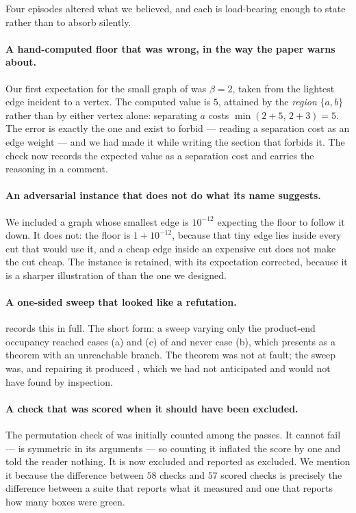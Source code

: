 \documentclass[11pt,twocolumn,a4paper]{article}
\theoremstyle{thmstyle}
\theoremstyle{definition}
\theoremstyle{remark}
\newcommand{\flo}{\beta}
\begin{document}
Four episodes altered what we believed, and each is load-bearing enough to
state rather than to absorb silently.

\paragraph{A hand-computed floor that was wrong, in the way the paper warns
about.} Our first expectation for the small graph of  was
$\flo=2$, taken from the lightest edge incident to a vertex. The computed
value is $5$, attained by the \emph{region} $\{a,b\}$ rather than by either
vertex alone: separating $a$ costs $\min(2+5,\,2+3)=5$. The error is exactly
the one  and  exist to forbid --- reading
a separation cost as an edge weight --- and we had made it while writing the
section that forbids it. The check now records the expected value as a
separation cost and carries the reasoning in a comment.

\paragraph{An adversarial instance that does not do what its name suggests.}
We included a graph whose smallest edge is $10^{-12}$ expecting the floor to
follow it down. It does not: the floor is $1+10^{-12}$, because that tiny edge
lies inside every cut that would use it, and a cheap edge inside an expensive
cut does not make the cut cheap. The instance is retained, with its
expectation corrected, because it is a sharper illustration of
 than the one we designed.

\paragraph{A one-sided sweep that looked like a refutation.}
 records this in full. The short form: a sweep
varying only the product-end occupancy reached cases (a) and (c) of
 and never case (b), which presents as a theorem with an
unreachable branch. The theorem was not at fault; the sweep was, and repairing
it produced , which we had not anticipated and would not
have found by inspection.

\paragraph{A check that was scored when it should have been excluded.} The
permutation check of  was initially counted among the
passes. It cannot fail ---  is symmetric in its arguments ---
so counting it inflated the score by one and told the reader nothing. It is
now excluded and reported as excluded. We mention it because the difference
between $58$ checks and $57$ scored checks is precisely the difference between
a suite that reports what it measured and one that reports how many boxes were
green.
\end{document}
